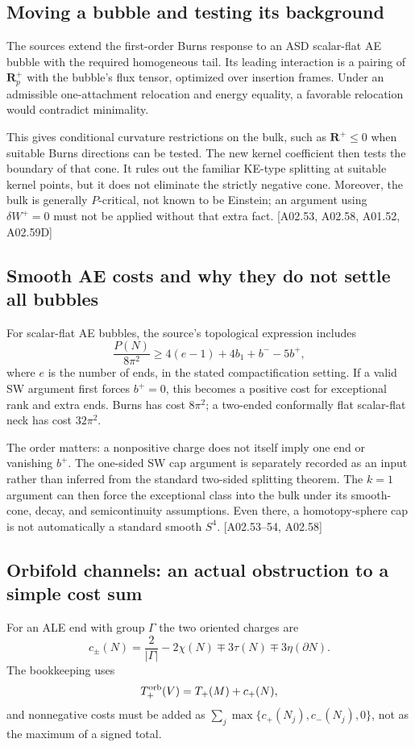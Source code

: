 \documentclass[11pt]{article}
\newcommand{\Rplus}{\mathbf R^+}
\newcommand{\sref}[1]{\textsf{[#1]}}
\theoremstyle{remark}
\begin{document}
\subsection{Moving a bubble and testing its background}
The sources extend the first-order Burns response to an ASD scalar-flat AE
bubble with the required homogeneous tail. Its leading interaction is a
pairing of $\Rplus_p$ with the bubble's flux tensor, optimized over insertion
frames. Under an admissible one-attachment relocation and energy equality,
a favorable relocation would contradict minimality.

This gives conditional curvature restrictions on the bulk, such as
$\Rplus\le0$ when suitable Burns directions can be tested. The new kernel
coefficient then tests the boundary of that cone. It rules out the familiar
KE-type splitting at suitable kernel points, but it does not eliminate the
strictly negative cone. Moreover, the bulk is generally $P$-critical, not
known to be Einstein; an argument using $\delta W^+=0$ must not be applied
without that extra fact. \sref{A02.53, A02.58, A01.52, A02.59D}

\subsection{Smooth AE costs and why they do not settle all bubbles}
For scalar-flat AE bubbles, the source's topological expression includes
\[
 \frac{P(N)}{8\pi^2}\ge
 4(e-1)+4b_1+b^- -5b^+,
\]
where $e$ is the number of ends, in the stated compactification setting.
If a valid SW argument first forces $b^+=0$, this becomes a positive cost
for exceptional rank and extra ends. Burns has cost $8\pi^2$; a two-ended
conformally flat scalar-flat neck has cost $32\pi^2$.

The order matters: a nonpositive charge does not itself imply one end or
vanishing $b^+$. The one-sided SW cap argument is separately recorded as an
input rather than inferred from the standard two-sided splitting theorem.
The $k=1$ argument can then force the exceptional class into the bulk under
its smooth-cone, decay, and semicontinuity assumptions. Even there, a
homotopy-sphere cap is not automatically a standard smooth $S^4$.
\sref{A02.53--54, A02.58}

\subsection{Orbifold channels: an actual obstruction to a simple cost sum}
For an ALE end with group $\Gamma$ the two oriented charges are
\[
 c_\pm(N)=\frac2{|\Gamma|}-2\chi(N)\mp3\tau(N)\mp3\eta(\partial N).
\]
The bookkeeping uses
\[
 T_+^{\rm orb}(V)=T_+(M)+c_+(N),
\]
and nonnegative costs must be added as
$\sum_j\max\{c_+(N_j),c_-(N_j),0\}$, not as the maximum of a signed total.
\end{document}
